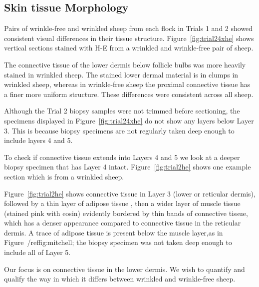 \documentclass[]{interact}
\theoremstyle{plain}%
\theoremstyle{definition}
\theoremstyle{remark}
\begin{document}
\subsection{Skin tissue Morphology}
Pairs of wrinkle-free and wrinkled sheep from each flock in Trials 1 and 2 showed consistent visual differences in their tissue structure. Figure~\ref{fig:trial24xhe} shows vertical sections stained with H-E from a wrinkled and wrinkle-free pair of sheep. 



The connective tissue of the lower dermis below follicle bulbs was more heavily stained in wrinkled sheep. The stained lower dermal material is in clumps in wrinkled sheep, whereas in wrinkle-free sheep the proximal connective tissue has a finer more uniform structure. 
These differences were consistent across all sheep.

Although the Trial 2 biopsy samples were not trimmed before sectioning, the specimens displayed in Figure~\ref{fig:trial24xhe} do not show any layers below Layer 3.  This is because biopsy specimens are not regularly taken deep enough to include layers 4 and 5.

 To check if connective tissue extends into Layers 4 and 5  we look at a deeper biopsy specimen that has Layer 4 intact.   Figure~\ref{fig:trial2he} shows one example section which is from a wrinkled sheep.


Figure~\ref{fig:trial2he} shows connective tissue in Layer 3 (lower or reticular dermis), followed by a thin layer of adipose tissue , then a wider layer of muscle tissue  (stained pink with eosin) evidently bordered by thin bands of connective tissue, which has a denser appearance  compared to connective tissue in the reticular dermis. A trace of adipose tissue is present below the muscle layer,as in Figure~/ref{fig:mitchell}; the biopsy specimen was not taken deep enough to include all of Layer 5.


Our focus is on connective tissue in the lower dermis. We wish to quantify and qualify the way in which it differs between wrinkled and wrinkle-free sheep.
\end{document}

